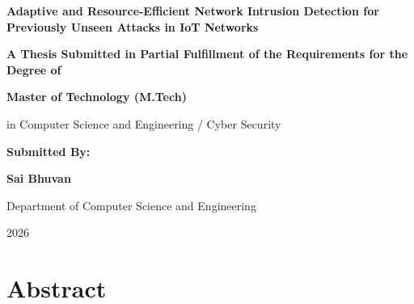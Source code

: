 \documentclass[12pt,a4paper,oneside]{report}
\begin{document}
\begin{titlepage}
\centering
\vspace*{1cm}

{\Huge \textbf{Adaptive and Resource-Efficient Network Intrusion Detection for Previously Unseen Attacks in IoT Networks}\par}
\vspace{1.5cm}

{\Large \textbf{A Thesis Submitted in Partial Fulfillment of the Requirements for the Degree of}\par}
\vspace{0.5cm}
{\Large \textbf{Master of Technology (M.Tech)}\par}
\vspace{0.3cm}
{\large in Computer Science and Engineering / Cyber Security\par}

\vspace{2cm}
{\large \textbf{Submitted By:}\par}
{\Large \textbf{Sai Bhuvan}\par}

\vfill
{\large Department of Computer Science and Engineering\par}
\vspace{0.3cm}
{\large 2026\par}
\end{titlepage}

\newpage
{}
\chapter*{Abstract}
\end{document}
